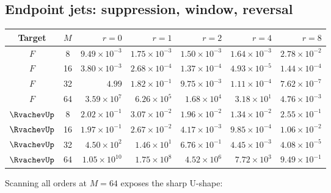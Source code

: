 \documentclass[11pt,oneside]{article}
\numberwithin{equation}{section}
\theoremstyle{definition}
\theoremstyle{remark}
\begin{document}
\subsection{Endpoint jets: suppression, window, reversal}

\begin{center}
\small
\setlength{\tabcolsep}{4.5pt}
\begin{tabular}{@{}ccrrrrr@{}}
\toprule
Target & $M$ & $r=0$ & $r=1$ & $r=2$ & $r=4$ & $r=8$\\
\midrule
$F$ & 8  & $9.49\times10^{-3}$ & $1.75\times10^{-3}$ & $1.50\times10^{-3}$ & $1.64\times10^{-3}$ & $2.78\times10^{-2}$\\
$F$ & 16 & $3.80\times10^{-3}$ & $2.68\times10^{-4}$ & $1.37\times10^{-4}$ & $4.93\times10^{-5}$ & $1.44\times10^{-4}$\\
$F$ & 32 & $4.99$ & $1.82\times10^{-1}$ & $9.75\times10^{-3}$ & $1.11\times10^{-4}$ & $7.62\times10^{-7}$\\
$F$ & 64 & $3.59\times10^{7}$ & $6.26\times10^{5}$ & $1.68\times10^{4}$ & $3.18\times10^{1}$ & $4.76\times10^{-3}$\\
\midrule
$\RvachevUp$ & 8  & $2.02\times10^{-1}$ & $3.07\times10^{-2}$ & $1.96\times10^{-2}$ & $1.34\times10^{-2}$ & $2.55\times10^{-1}$\\
$\RvachevUp$ & 16 & $1.97\times10^{-1}$ & $2.67\times10^{-2}$ & $4.17\times10^{-3}$ & $9.85\times10^{-4}$ & $1.06\times10^{-2}$\\
$\RvachevUp$ & 32 & $4.50\times10^{2}$ & $1.46\times10^{1}$ & $6.76\times10^{-1}$ & $4.45\times10^{-3}$ & $4.08\times10^{-5}$\\
$\RvachevUp$ & 64 & $1.05\times10^{10}$ & $1.75\times10^{8}$ & $4.52\times10^{6}$ & $7.72\times10^{3}$ & $9.49\times10^{-1}$\\
\bottomrule
\end{tabular}
\label{tab:fixed-errors}
\end{center}

Scanning all orders at $M=64$ exposes the sharp U-shape:
\end{document}
